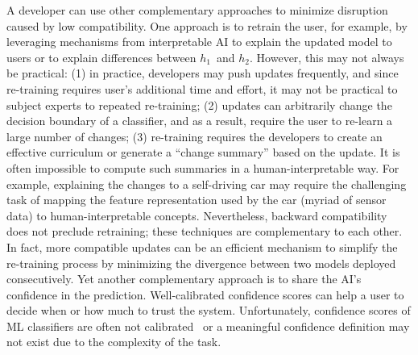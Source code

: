 \documentclass[letterpaper]{article} %
\newcommand{\bug}
    {\mbox{\rule{2mm}{2mm}}}
\newcommand{\Bug}[1]
    {\bug \footnote{BUG: {#1}}}
\newcommand{\?}{\mbox{?}}
\newcommand{\hone}{\mbox{$h_1$}}
\newcommand{\htwo}{\mbox{$h_2$}}
\begin{document}
A developer can use other complementary approaches to minimize disruption caused by low compatibility. One approach is to retrain the user, for example, by leveraging mechanisms from interpretable AI to explain the updated model to users or to explain differences between \hone\ and \htwo. However, this may not always be practical: 
(1) in practice, developers may push updates frequently, and since re-training requires user’s additional time and effort, it may not be practical to subject experts to repeated re-training; 
(2) updates can arbitrarily change the decision boundary of a classifier, and as a result, require the user to re-learn a large number of changes;
(3) re-training requires the developers to create an effective curriculum or generate a “change summary” based on the update. It is often impossible to compute such summaries in a human-interpretable way.
For example, explaining the changes to a self-driving car may require the challenging task of mapping the feature representation used by the car (myriad of sensor data) to human-interpretable concepts.
Nevertheless, backward compatibility does not preclude retraining; these techniques are complementary to each other. In fact, more compatible updates can be an efficient mechanism to simplify the re-training process by minimizing the divergence between two models deployed consecutively. Yet another complementary approach is to share the AI's confidence in the prediction. Well-calibrated confidence scores can help a user to decide when or how much to trust the system. Unfortunately, confidence scores of ML classifiers are often not calibrated~\cite{nguyen2015deep} or a meaningful confidence definition may not exist due to the complexity of the task.


\end{document}
